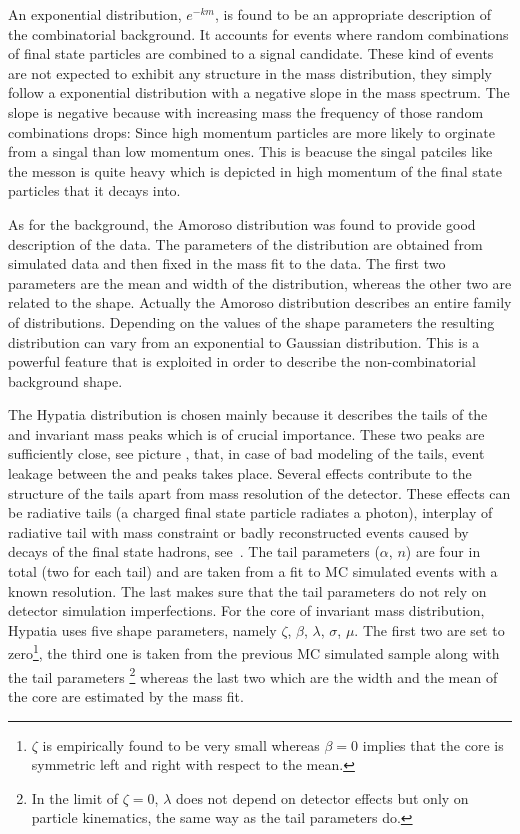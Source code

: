 \noindent An exponential distribution, $e^{-km}$, is found to be an appropriate description of the combinatorial background. It  accounts
for events where random combinations of final state particles are combined to a signal candidate. These kind of events are not expected to
exhibit any structure in the mass distribution, they simply follow a exponential distribution with a negative slope in the mass spectrum.
The slope is negative because with increasing mass the frequency of those random combinations drops: Since high momentum particles are more
likely to orginate from a singal than low momentum ones. This is beacuse the singal patciles like the \Bs messon is quite heavy which is
depicted in high momentum of the final state particles that it decays into.

As for the \LbJpsippi background, the Amoroso distribution was found to provide good description of the data.
The parameters of the distribution are obtained from simulated data and then fixed in the mass fit to the data. The first two parameters
are the mean and width of the distribution, whereas the other two are related to the shape. Actually the Amoroso distribution describes
an entire family of distributions. Depending on the values of the shape parameters the resulting distribution can vary from an exponential
to Gaussian distribution. This is a powerful feature that is exploited in order to describe the \LbJpsippi non-combinatorial background shape.

The Hypatia distribution is chosen mainly because it describes the tails of the \Bs and \Bd invariant mass peaks which is
of crucial importance. These two peaks are sufficiently close,
see picture , that, in case of bad modeling of the tails, event leakage between the \Bs and \Bd peaks
takes place. Several effects contribute to the structure of the tails apart from mass resolution of the detector. These effects
can be radiative tails (a charged final state particle radiates a photon), interplay of radiative tail with \jpsi mass constraint
or badly reconstructed events caused by decays of the final state hadrons, see~\cite{Santos:2013gra}. The tail parameters ($\alpha$, $n$)
are four in total (two for each tail) and are taken from a fit to MC simulated events with a known resolution. The last makes sure that
the tail parameters do not rely on detector simulation imperfections.
For the core of invariant mass distribution, Hypatia uses five shape parameters, namely $\zeta$, $\beta$, $\lambda$, $\sigma$, $\mu$.
The first two are set to zero\footnote{$\zeta$ is empirically found to be very small whereas
$\beta = 0$ implies that the core is symmetric left and right with respect to the mean.}, the third one is taken from the previous
MC simulated sample along with the tail parameters \footnote{In the limit of $\zeta = 0$, $\lambda$ does not depend on detector
effects but only on particle kinematics, the same way as the tail parameters do.} whereas the last two which are the width and
the mean of the core are estimated by the mass fit.

